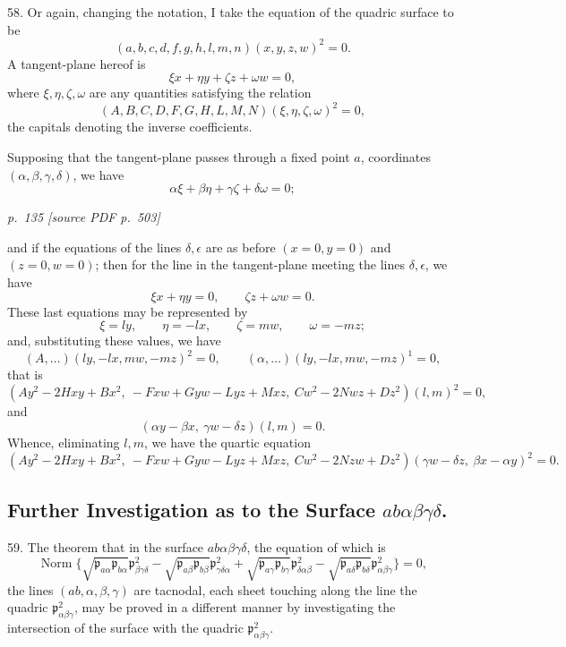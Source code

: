 \documentclass[11pt,a4paper]{article}
\newcommand{\sourcepage}[2]{%
  \bigskip
  \noindent\textit{p.~#1 [source PDF p.~#2]}%
  \par\smallskip
}
\newcommand{\p}{\mathfrak p}
\newcommand{\Norm}{\operatorname{Norm}}
\begin{document}
58. Or again, changing the notation, I take the equation of the quadric surface to be
\[
(a,b,c,d,f,g,h,l,m,n)(x,y,z,w)^2=0.
\]
A tangent-plane hereof is
\[
\xi x+\eta y+\zeta z+\omega w=0,
\]
where $\xi,\eta,\zeta,\omega$ are any quantities satisfying the relation
\[
(A,B,C,D,F,G,H,L,M,N)(\xi,\eta,\zeta,\omega)^2=0,
\]
the capitals denoting the inverse coefficients.

Supposing that the tangent-plane passes through a fixed point $a$, coordinates
$(\alpha,\beta,\gamma,\delta)$, we have
\[
\alpha\xi+\beta\eta+\gamma\zeta+\delta\omega=0;
\]

\sourcepage{135}{503}
and if the equations of the lines $\delta,\epsilon$ are as before $(x=0,y=0)$ and
$(z=0,w=0)$; then for the line in the tangent-plane meeting the lines
$\delta,\epsilon$, we have
\[
\xi x+\eta y=0,\qquad \zeta z+\omega w=0.
\]
These last equations may be represented by
\[
\xi=ly,\qquad \eta=-lx,\qquad \zeta=mw,\qquad \omega=-mz;
\]
and, substituting these values, we have
\[
(A,\ldots)(ly,-lx,mw,-mz)^2=0,
\qquad
(\alpha,\ldots)(ly,-lx,mw,-mz)^1=0,
\]
that is
\[
(Ay^2-2Hxy+Bx^2,\ -Fxw+Gyw-Lyz+Mxz,\ Cw^2-2Nwz+Dz^2)(l,m)^2=0,
\]
and
\[
(\alpha y-\beta x,\ \gamma w-\delta z)(l,m)=0.
\]
Whence, eliminating $l,m$, we have the quartic equation
\[
(Ay^2-2Hxy+Bx^2,\ -Fxw+Gyw-Lyz+Mxz,\ Cw^2-2Nzw+Dz^2)
(\gamma w-\delta z,\ \beta x-\alpha y)^2=0.
\]

\subsection*{Further Investigation as to the Surface \(ab\alpha\beta\gamma\delta\).}

59. The theorem that in the surface $ab\alpha\beta\gamma\delta$, the equation of
which is
\[
\Norm\{\sqrt{\p_{a\alpha}\p_{b\alpha}}\p^2_{\beta\gamma\delta}
-\sqrt{\p_{a\beta}\p_{b\beta}}\p^2_{\gamma\delta\alpha}
+\sqrt{\p_{a\gamma}\p_{b\gamma}}\p^2_{\delta\alpha\beta}
-\sqrt{\p_{a\delta}\p_{b\delta}}\p^2_{\alpha\beta\gamma}\}=0,
\]
the lines $(ab,\alpha,\beta,\gamma)$ are tacnodal, each sheet touching along the
line the quadric $\p^2_{\alpha\beta\gamma}$, may be proved in a different manner
by investigating the intersection of the surface with the quadric
$\p^2_{\alpha\beta\gamma}$.
\end{document}
